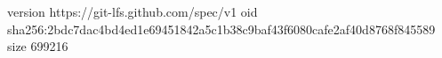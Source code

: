 version https://git-lfs.github.com/spec/v1
oid sha256:2bdc7dac4bd4ed1e69451842a5c1b38c9baf43f6080cafe2af40d8768f845589
size 699216
